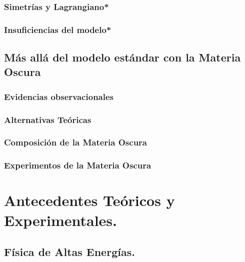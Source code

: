\documentclass[11pt,english]{report}
\begin{document}
		\subsection{Simetrías y Lagrangiano*} 
		
	
		\subsection{Insuficiencias del modelo*}
		
	
	
	\section{M\'as all\'a del modelo est\'andar con la Materia Oscura}
	
	
		\subsection{Evidencias observacionales}
		
		
		\subsection{Alternativas Teóricas}
		
		
		\subsection{Composición de la Materia Oscura}
		
		
		\subsection{Experimentos de la Materia Oscura}
				


\chapter{Antecedentes Teóricos y Experimentales.}

		
	\section{Física de Altas Energías.}
	
		
\end{document}
